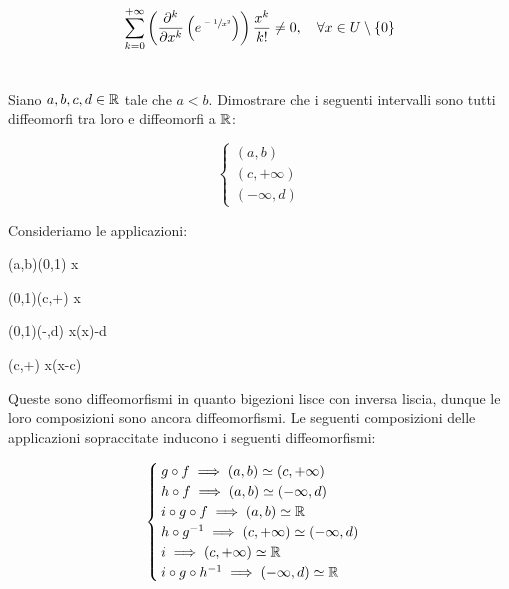 \begin{equation}
	\sum_{k=0}^{+\infty} \left( \pdv[k]{x} \left( e^{\sfrac{-1}{x^{2}}} \right) \right) \dfrac{x^{k}}{k!} \neq 0 \qcomma \forall x \in U \setminus \{0\}
\end{equation}

%

\newpage

%

\section{}\label{es1-3}

\begin{tcolorbox}
	Siano $ a,b,c,d \in \mathbb{R} $ tale che $ a<b $. Dimostrare che i seguenti intervalli sono tutti diffeomorfi tra loro e diffeomorfi a $ \mathbb{R} $:
	
	\begin{equation}
		\begin{cases}
			(a,b)\\
			(c,+\infty)\\
			(-\infty,d)
		\end{cases}
	\end{equation}
\end{tcolorbox}

Consideriamo le applicazioni:

	{(a,b)}{(0,1)}
	{x}{}

	{(0,1)}{(c,+\infty)}
	{x}{}

	{(0,1)}{(-\infty,d)}
	{x}{\ln(x)-d}

	{(c,+\infty)}{\R}
	{x}{\ln(x-c)}

Queste sono diffeomorfismi in quanto bigezioni lisce con inversa liscia, dunque le loro composizioni sono ancora diffeomorfismi. Le seguenti composizioni delle applicazioni sopraccitate inducono i seguenti diffeomorfismi:

\begin{equation}
	\begin{cases}
		g \circ f \implies (a,b) \simeq (c,+\infty)\\
		h \circ f \implies (a,b) \simeq (-\infty,d)\\
		i \circ g \circ f \implies (a,b) \simeq \mathbb{R}\\
		h \circ g^{-1} \implies (c,+\infty) \simeq (-\infty,d)\\
		i \implies (c,+\infty) \simeq \mathbb{R}\\
		i \circ g \circ h^{-1} \implies (-\infty,d) \simeq \mathbb{R}
	\end{cases}
\end{equation}

